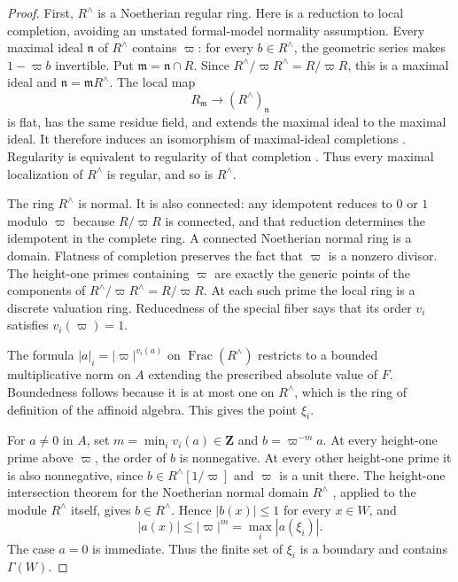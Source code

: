 \documentclass[11pt,a4paper]{article}
\numberwithin{equation}{section}
\theoremstyle{definition}
\theoremstyle{remark}
\begin{document}
\begin{proof}
First, $R^\wedge$ is a Noetherian regular ring.  Here is a reduction
to local completion, avoiding an unstated formal-model normality
assumption.  Every maximal ideal $\mathfrak n$ of $R^\wedge$ contains
$\varpi$: for every $b\in R^\wedge$, the geometric series makes
$1-\varpi b$ invertible.  Put $\mathfrak m=\mathfrak n\cap R$.
Since $R^\wedge/\varpi R^\wedge=R/\varpi R$, this is a maximal
ideal and $\mathfrak n=\mathfrak mR^\wedge$.  The local map
\[
 R_{\mathfrak m}\longrightarrow (R^\wedge)_{\mathfrak n}
\]
is flat, has the same residue field, and extends the maximal ideal
to the maximal ideal.  It therefore induces an isomorphism of
maximal-ideal completions \cite[Tag 0AGX]{Stacks}.  Regularity is
equivalent to regularity of that completion
\cite[Tag 07NY]{Stacks}.  Thus every maximal localization of
$R^\wedge$ is regular, and so is $R^\wedge$.

The ring $R^\wedge$ is normal.  It is also connected: any idempotent
reduces to $0$ or $1$ modulo $\varpi$ because $R/\varpi R$ is
connected, and that reduction determines the idempotent in the
complete ring.  A connected Noetherian normal ring is a domain.
Flatness of completion preserves the fact that $\varpi$ is a
nonzero divisor.  The height-one primes containing $\varpi$ are
exactly the generic points of the components of
$R^\wedge/\varpi R^\wedge=R/\varpi R$.  At each such prime the
local ring is a discrete valuation ring.  Reducedness of the special
fiber says that its order $v_i$ satisfies $v_i(\varpi)=1$.

The formula $|a|_i=|\varpi|^{v_i(a)}$ on
$\operatorname{Frac}(R^\wedge)$ restricts to a bounded
multiplicative norm on $A$ extending the prescribed absolute value
of $F$.  Boundedness follows because it is at most one on
$R^\wedge$, which is the ring of definition of the affinoid algebra.
This gives the point $\xi_i$.

For $a\ne0$ in $A$, set $m=\min_i v_i(a)\in\mathbf Z$ and
$b=\varpi^{-m}a$.  At every height-one prime above $\varpi$, the
order of $b$ is nonnegative.  At every other height-one prime it is
also nonnegative, since $b\in R^\wedge[1/\varpi]$ and $\varpi$
is a unit there.  The height-one intersection theorem for the
Noetherian normal domain $R^\wedge$
\cite[Tag 0AVB]{Stacks}, applied to the module $R^\wedge$ itself,
gives $b\in R^\wedge$.  Hence $|b(x)|\leq1$ for every $x\in W$,
and
\[
 |a(x)|\leq|\varpi|^m=\max_i|a(\xi_i)|.
\]
The case $a=0$ is immediate.  Thus the finite set of $\xi_i$ is a
boundary and contains $\Gamma(W)$.


\end{proof}
\end{document}
